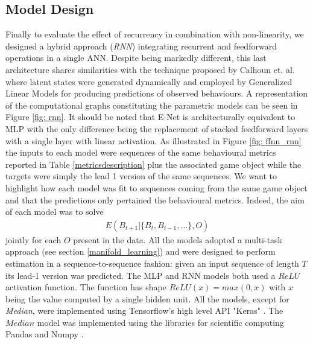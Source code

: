 \subsection{Model Design}
Finally to evaluate the effect of recurrency in combination with non-linearity, we designed a hybrid approach (\textit{RNN}) integrating recurrent and feedforward operations in a single ANN. Despite being markedly different, this last architecture shares similarities with the technique proposed by Calhoun et. al. \cite{calhoun2019unsupervised} where latent states were generated dynamically and employed by Generalized Linear Models for producing predictions of observed behaviours. A representation of the computational graphs constituting the parametric models can be seen in Figure \ref{fig: rnn}. It should be noted that E-Net is architecturally equivalent to MLP with the only difference being the replacement of stacked feedforward layers with a single layer with linear activation. As illustrated in Figure \ref{fig: ffnn_rnn} the inputs to each model were sequences of the same behavioural metrics reported in Table \ref{metricsdescription} plus the associated game object while the targets were simply the lead 1 version of the same sequences. We want to highlight how each model was fit to sequences coming from the same game object and that the predictions only pertained the behavioural metrics. Indeed, the aim of each model was to solve
\begin{equation}
    \begin{gathered}
        E(B_{t+1} | \{B_{t}, B_{t-1}, \dots \} , O)
        \label{model_obj}
    \end{gathered}
\end{equation}
jointly for each $O$ present in the data. All the models adopted a multi-task approach (see section \ref{manifold_learning}) and were designed to perform estimation in a sequence-to-sequence fashion: given an input sequence of length $T$ its lead-1 version was predicted. The MLP and RNN models both used a $ReLU$ activation function. The function has shape $ReLU(x) = max(0, x)$ with $x$ being the value computed by a single hidden unit. All the models, except for \textit{Median}, were implemented using Tensorflow's high level API "Keras" \cite{tensorflow2015-whitepaper,chollet2015keras}. The $Median$ model was implemented using the libraries for scientific computing Pandas and Numpy \cite{reback2020pandas,harris2020array}.



